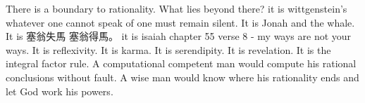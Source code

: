 There is a boundary to rationality. What lies beyond there? it is wittgenstein’s whatever one cannot speak of one must remain silent. It is Jonah and the whale. It is 塞翁失馬 塞翁得馬。 it is isaiah chapter 55 verse 8 - my ways are not your ways. It is reflexivity. It is karma. It is serendipity. It is revelation. It is the integral factor rule. A computational competent man would compute his rational conclusions without fault. A wise man would know where his rationality ends and let God work his powers. 


